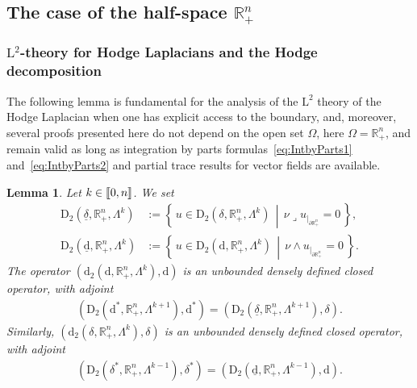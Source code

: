 \documentclass[10pt]{amsart}
\newtheorem{lemm}[theo]{Lemma}\newtheorem{prop}[theo]{Proposition}\newtheorem{coro}[theo]{Corollary}\newtheorem{conj}[theo]{Conjecture}
\theoremstyle{definition}\newtheorem{defi}[theo]{Definition}\newtheorem{rema}[theo]{Remark}\newtheorem{exam}[theo]{Example}\newtheorem{exem}[theo]{Example}\newtheorem{nota}[theo]{Notation}
\newcommand{\bbR}{\mathbb{R}}
\newcommand{\rmd}{\mathrm{d}}
\newcommand{\rmD}{\mathrm{D}}
\newcommand{\rmL}{\mathrm{L}}
\newcommand{\llbracket}{\mathopen{[\mkern -2.7mu[}}
\newcommand{\rrbracket}{\mathclose{]\mkern -2.7mu]}}
\newcommand{\llb}{\llbracket}
\newcommand{\rrb}{\rrbracket}
\newcommand{\iprod}{\mathbin{\lrcorner}}
\begin{document}
\subsection{The case of the half-space \texorpdfstring{$\bbR^n_+$}{Rn+}}

\subsubsection{\texorpdfstring{$\rmL^2$}{L2}-theory for Hodge Laplacians and the Hodge decomposition}

The following lemma is fundamental for the analysis of the $\rmL^2$ theory of the Hodge Laplacian when one has explicit access to the boundary, and, moreover, several proofs presented here do not depend on the open set $\Omega$, here $\Omega=\bbR^n_+$, and remain valid as long as integration by parts formulas~\eqref{eq:IntbyParts1} and~\eqref{eq:IntbyParts2} and partial trace results for vector fields are available.

\begin{lemm}\label{lem:closdenessNdualityDerivativesL2Rn+}
Let $k\in\llb 0,n\rrb$. We set
\begin{align*}
\rmD_2\left(\underline{\delta},\bbR^n_+,\Lambda^{k}\right) &:=\left\{\,u\in \rmD_2\left(\delta,\bbR^n_+,\Lambda^{k}\right)\,\middle|\, \nu\iprod u_{|_{\partial\bbR^n_+}}=0\,\right\}, \\
\rmD_2\left(\underline{\rmd},\bbR^n_+,\Lambda^{k}\right) &:= \left\{\,u\in \rmD_2\left(\rmd,\bbR^n_+,\Lambda^{k}\right)\,\middle|\, \nu\wedge u_{|_{\partial\bbR^n_+}}=0\,\right\}.
\end{align*}
The operator $(\rmd_2(\rmd,\bbR^n_+,\Lambda^{k}),\rmd)$ is an unbounded densely defined closed operator, with adjoint
\begin{align}\label{eq:L2dualofextderiv.}
\left(\rmD_2\left(\rmd^\ast,\bbR^n_+,\Lambda^{k+1}\right),\rmd^\ast\right)=\left(\rmD_2\left(\underline{\delta},\bbR^n_+,\Lambda^{k+1}\right),\delta\right).
\end{align}
Similarly, $(\rmd_2(\delta,\bbR^n_+,\Lambda^{k}),\delta)$ is an unbounded densely defined closed operator, with adjoint
\begin{align}\label{eq:L2dualofintderiv.}
\left(\rmD_2\left(\delta^\ast,\bbR^n_+,\Lambda^{k-1}\right),\delta^\ast\right)=\left(\rmD_2\left(\underline{\rmd},\bbR^n_+,\Lambda^{k-1}\right),\rmd\right).
\end{align}
\end{lemm}
\end{document}
